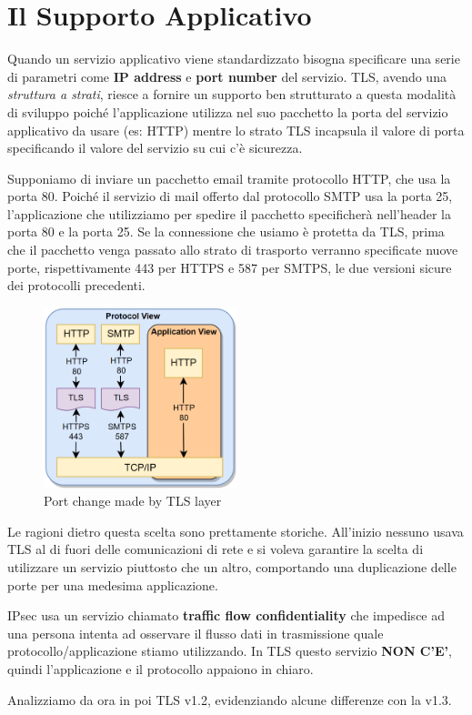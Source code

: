 \section{Il Supporto Applicativo}
Quando un servizio applicativo viene standardizzato bisogna specificare una serie di parametri come \textbf{IP address} e \textbf{port number} del servizio. TLS, avendo una \textit{struttura a strati}, riesce a fornire un supporto ben strutturato a questa modalità di sviluppo poiché l'applicazione utilizza nel suo pacchetto la porta del servizio applicativo da usare (es: HTTP) mentre lo strato TLS incapsula il valore di porta specificando il valore del servizio su cui c'è sicurezza.
\begin{example}
Supponiamo di inviare un pacchetto email tramite protocollo HTTP, che usa la porta 80. Poiché il servizio di mail offerto dal protocollo SMTP usa la porta 25, l'applicazione che utilizziamo per spedire il pacchetto specificherà nell'header la porta 80 e la porta 25. Se la connessione che usiamo è protetta da TLS, prima che il pacchetto venga passato allo strato di trasporto verranno specificate nuove porte, rispettivamente 443 per HTTPS e 587 per SMTPS, le due versioni sicure dei protocolli precedenti. 
\end{example}
\begin{figure}[H]
    \centering
    \includegraphics[width=0.5\textwidth]{image/tlsencapsulation.png}
    \caption{Port change made by TLS layer}
    \label{fig:tlsencapsulation}
\end{figure}
\begin{remark}
Le ragioni dietro questa scelta sono prettamente storiche. All'inizio nessuno usava TLS al di fuori delle comunicazioni di rete e si voleva garantire la scelta di utilizzare un servizio piuttosto che un altro, comportando una duplicazione delle porte per una medesima applicazione.
\end{remark}
\begin{remark}
IPsec usa un servizio chiamato \textbf{traffic flow confidentiality} che impedisce ad una persona intenta ad osservare il flusso dati in trasmissione quale protocollo/applicazione stiamo utilizzando. In TLS questo servizio \textbf{NON C'E'}, quindi l'applicazione e il protocollo appaiono in chiaro.
\end{remark}
\begin{remark}
Analizziamo da ora in poi TLS v1.2, evidenziando alcune differenze con la v1.3.
\end{remark}
